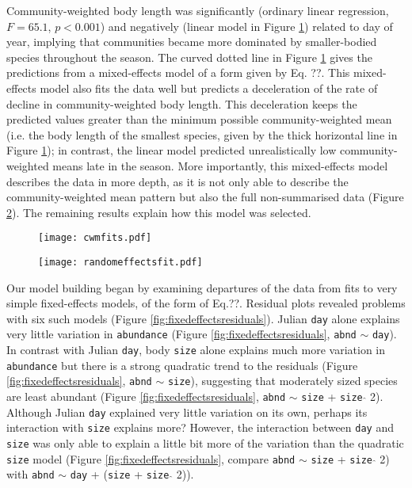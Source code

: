 \documentclass[12pt]{ecology}
\begin{document}
Community-weighted body length was significantly (ordinary linear regression, $F = 65.1$, $p < 0.001$) and negatively (linear model in Figure \ref{fig:cwmfits}) related to day of year, implying that communities became more dominated by smaller-bodied species throughout the season.  The curved dotted line in Figure \ref{fig:cwmfits} gives the predictions from a mixed-effects model of a form given by Eq. ??.  This mixed-effects model also fits the data well but predicts a deceleration of the rate of decline in community-weighted body length.  This deceleration keeps the predicted values greater than the minimum possible community-weighted mean (i.e. the body length of the smallest species, given by the thick horizontal line in Figure \ref{fig:cwmfits}); in contrast, the linear model predicted unrealistically low community-weighted means late in the season.  More importantly, this mixed-effects model describes the data in more depth, as it is not only able to describe the community-weighted mean pattern but also the full non-summarised data (Figure \ref{fig:randomeffectsfit}).  The remaining results explain how this model was selected.


\begin{figure}
\texttt{[image: cwmfits.pdf]}
\caption{}
\label{fig:cwmfits}
\end{figure}

\begin{figure}
\texttt{[image: randomeffectsfit.pdf]}
\caption{}
\label{fig:randomeffectsfit}
\end{figure}

Our model building began by examining departures of the data from fits to very simple fixed-effects models, of the form of Eq.??.  Residual plots revealed problems with six such models (Figure \ref{fig:fixedeffectsresiduals}).  Julian \texttt{day} alone explains very little variation in \texttt{abundance} (Figure \ref{fig:fixedeffectsresiduals}, \texttt{abnd} $\sim$ \texttt{day}).  In contrast with Julian \texttt{day}, body \texttt{size} alone explains much more variation in \texttt{abundance} but there is a strong quadratic trend to the residuals (Figure \ref{fig:fixedeffectsresiduals}, \texttt{abnd} $\sim$ \texttt{size}), suggesting that moderately sized species are least abundant (Figure \ref{fig:fixedeffectsresiduals}, \texttt{abnd} $\sim$ \texttt{size} + \texttt{size} $\hat{}$ 2).  Although Julian \texttt{day} explained very little variation on its own, perhaps its interaction with \texttt{size} explains more?  However, the interaction between \texttt{day} and \texttt{size} was only able to explain a little bit more of the variation than the quadratic \texttt{size} model (Figure \ref{fig:fixedeffectsresiduals}, compare \texttt{abnd} $\sim$ \texttt{size} + \texttt{size} $\hat{}$ 2) with \texttt{abnd} $\sim$ \texttt{day} + (\texttt{size} + \texttt{size} $\hat{}$ 2)).
\end{document}
